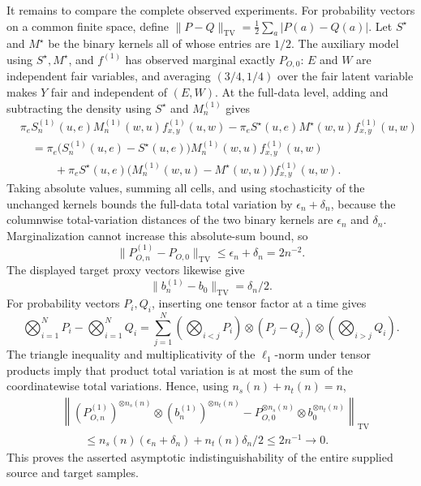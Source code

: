 It remains to compare the complete observed experiments.  For probability vectors on a common finite space, define
\(\lVert P-Q\rVert_{\mathrm{TV}}=\frac12\sum_a|P(a)-Q(a)|\).  Let \(S^{\star}\) and \(M^{\star}\) be the binary kernels all of whose entries are \(1/2\).  The auxiliary model using \(S^{\star},M^{\star}\), and \(f^{(1)}\) has observed marginal exactly \(P_{O,0}\): \(E\) and \(W\) are independent fair variables, and averaging \((3/4,1/4)\) over the fair latent variable makes \(Y\) fair and independent of \((E,W)\).  At the full-data level, adding and subtracting the density using \(S^{\star}\) and \(M_n^{(1)}\) gives
\[
\begin{aligned}
&\pi_eS_n^{(1)}(u,e)M_n^{(1)}(w,u)f^{(1)}_{x,y}(u,w)
-\pi_eS^{\star}(u,e)M^{\star}(w,u)f^{(1)}_{x,y}(u,w)\\
&\quad=\pi_e\bigl(S_n^{(1)}(u,e)-S^{\star}(u,e)\bigr)
M_n^{(1)}(w,u)f^{(1)}_{x,y}(u,w)\\
&\qquad\quad+\pi_eS^{\star}(u,e)
\bigl(M_n^{(1)}(w,u)-M^{\star}(w,u)\bigr)f^{(1)}_{x,y}(u,w).
\end{aligned}
\]
Taking absolute values, summing all cells, and using stochasticity of the unchanged kernels bounds the full-data total variation by \(\epsilon_n+\delta_n\), because the columnwise total-variation distances of the two binary kernels are \(\epsilon_n\) and \(\delta_n\).  Marginalization cannot increase this absolute-sum bound, so
\[
\lVert P_{O,n}^{(1)}-P_{O,0}\rVert_{\mathrm{TV}}
\le\epsilon_n+\delta_n=2n^{-2}.
\]
The displayed target proxy vectors likewise give
\[
\lVert b_n^{(1)}-b_0\rVert_{\mathrm{TV}}=\delta_n/2.
\]
For probability vectors \(P_i,Q_i\), inserting one tensor factor at a time gives
\[
\bigotimes_{i=1}^N P_i-\bigotimes_{i=1}^N Q_i
=\sum_{j=1}^N
\left(\bigotimes_{i<j}P_i\right)\otimes(P_j-Q_j)\otimes
\left(\bigotimes_{i>j}Q_i\right).
\]
The triangle inequality and multiplicativity of the \(\ell_1\)-norm under tensor products imply that product total variation is at most the sum of the coordinatewise total variations.  Hence, using \(n_s(n)+n_t(n)=n\),
\[
\begin{aligned}
&\left\lVert
(P_{O,n}^{(1)})^{\otimes n_s(n)}\otimes(b_n^{(1)})^{\otimes n_t(n)}
-P_{O,0}^{\otimes n_s(n)}\otimes b_0^{\otimes n_t(n)}
\right\rVert_{\mathrm{TV}}\\
&\qquad\le n_s(n)(\epsilon_n+\delta_n)+n_t(n)\delta_n/2
\le 2n^{-1}\longrightarrow0.
\end{aligned}
\]
This proves the asserted asymptotic indistinguishability of the entire supplied source and target samples.

